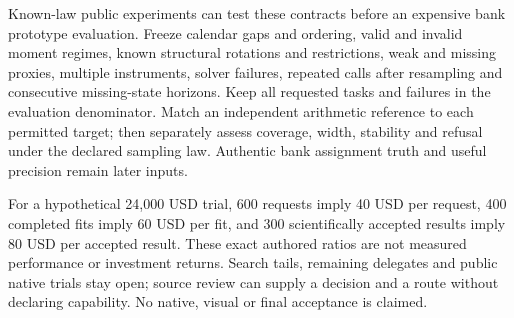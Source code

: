 Known-law public experiments can test these contracts before an expensive bank prototype evaluation. Freeze calendar gaps and ordering, valid and invalid moment regimes, known structural rotations and restrictions, weak and missing proxies, multiple instruments, solver failures, repeated calls after resampling and consecutive missing-state horizons. Keep all requested tasks and failures in the evaluation denominator. Match an independent arithmetic reference to each permitted target; then separately assess coverage, width, stability and refusal under the declared sampling law. Authentic bank assignment truth and useful precision remain later inputs.

For a hypothetical 24,000 USD trial, 600 requests imply 40 USD per request, 400 completed fits imply 60 USD per fit, and 300 scientifically accepted results imply 80 USD per accepted result. These exact authored ratios are not measured performance or investment returns. Search tails, remaining delegates and public native trials stay open; source review can supply a decision and a route without declaring capability. No native, visual or final acceptance is claimed.\citep{exec25_pydyn_choice}
